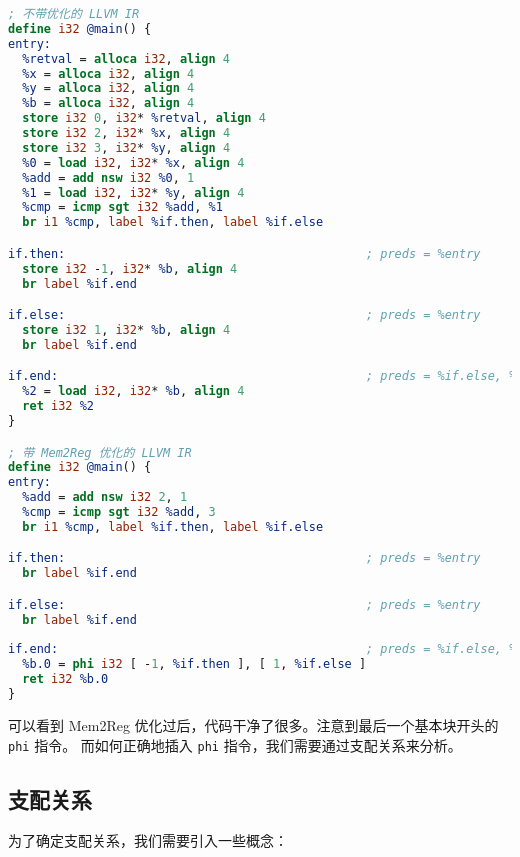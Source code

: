 \begin{lstlisting}[language=LLVM]
; 不带优化的 LLVM IR
define i32 @main() {
entry:
  %retval = alloca i32, align 4
  %x = alloca i32, align 4
  %y = alloca i32, align 4
  %b = alloca i32, align 4
  store i32 0, i32* %retval, align 4
  store i32 2, i32* %x, align 4
  store i32 3, i32* %y, align 4
  %0 = load i32, i32* %x, align 4
  %add = add nsw i32 %0, 1
  %1 = load i32, i32* %y, align 4
  %cmp = icmp sgt i32 %add, %1
  br i1 %cmp, label %if.then, label %if.else

if.then:                                          ; preds = %entry
  store i32 -1, i32* %b, align 4
  br label %if.end

if.else:                                          ; preds = %entry
  store i32 1, i32* %b, align 4
  br label %if.end

if.end:                                           ; preds = %if.else, %if.then
  %2 = load i32, i32* %b, align 4
  ret i32 %2
}

; 带 Mem2Reg 优化的 LLVM IR
define i32 @main() {
entry:
  %add = add nsw i32 2, 1
  %cmp = icmp sgt i32 %add, 3
  br i1 %cmp, label %if.then, label %if.else

if.then:                                          ; preds = %entry
  br label %if.end

if.else:                                          ; preds = %entry
  br label %if.end
    
if.end:                                           ; preds = %if.else, %if.then
  %b.0 = phi i32 [ -1, %if.then ], [ 1, %if.else ]
  ret i32 %b.0
}
\end{lstlisting}
可以看到 Mem2Reg 优化过后，代码干净了很多。注意到最后一个基本块开头的 \texttt{phi} 指令。
而如何正确地插入 \texttt{phi} 指令，我们需要通过支配关系来分析。

\subsection{支配关系}

为了确定支配关系，我们需要引入一些概念：

